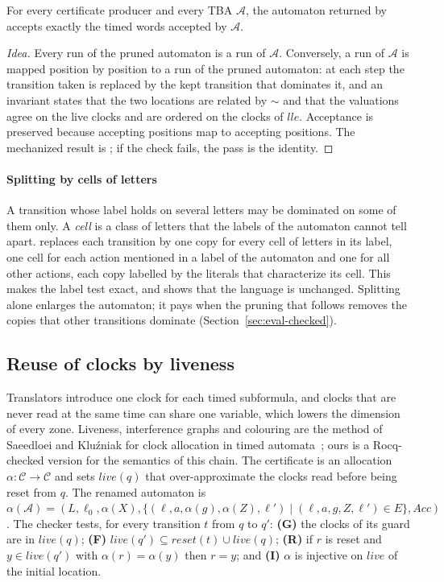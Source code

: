 \begin{theorem}[Pruning]
\label{thm:prune}
For every certificate producer and every TBA $\mathcal A$, the automaton returned by  accepts exactly the timed words accepted by $\mathcal A$.
\end{theorem}
\begin{proof}[Idea]
Every run of the pruned automaton is a run of $\mathcal A$. Conversely, a run of $\mathcal A$ is mapped position by position to a run of the pruned automaton: at each step the transition taken is replaced by the kept transition that dominates it, and an invariant states that the two locations are related by $\sim$ and that the valuations agree on the live clocks and are ordered on the clocks of $\mathit{lle}$. Acceptance is preserved because accepting positions map to accepting positions. The mechanized result is ; if the check fails, the pass is the identity.
\end{proof}

\paragraph{Splitting by cells of letters} A transition whose label holds on several letters may be dominated on some of them only. A \emph{cell} is a class of letters that the labels of the automaton cannot tell apart.  replaces each transition by one copy for every cell of letters in its label, one cell for each action mentioned in a label of the automaton and one for all other actions, each copy labelled by the literals that characterize its cell. This makes the label test exact, and  shows that the language is unchanged. Splitting alone enlarges the automaton; it pays when the pruning that follows removes the copies that other transitions dominate (Section~\ref{sec:eval-checked}).

\subsection{Reuse of clocks by liveness}
\label{sec:reuse}
Translators introduce one clock for each timed subformula, and clocks that are never read at the same time can share one variable, which lowers the dimension of every zone. Liveness, interference graphs and colouring are the method of Saeedloei and Kluźniak for clock allocation in timed automata~\cite{saeedloei_kluzniak_hscc2018}; ours is a Rocq-checked version for the semantics of this chain. The certificate is an allocation $\alpha:\mathcal C\to\mathcal C$ and sets $\mathit{live}(q)$ that over-approximate the clocks read before being reset from $q$. The renamed automaton is $\alpha(\mathcal A)=(L,\ell_0,\alpha(X),\{(\ell,a,\alpha(g),\alpha(Z),\ell')\mid(\ell,a,g,Z,\ell')\in E\},\mathit{Acc})$. The checker  tests, for every transition $t$ from $q$ to $q'$: \textbf{(G)} the clocks of its guard are in $\mathit{live}(q)$; \textbf{(F)} $\mathit{live}(q')\subseteq\mathit{reset}(t)\cup\mathit{live}(q)$; \textbf{(R)} if $r$ is reset and $y\in\mathit{live}(q')$ with $\alpha(r)=\alpha(y)$ then $r=y$; and \textbf{(I)} $\alpha$ is injective on $\mathit{live}$ of the initial location.

